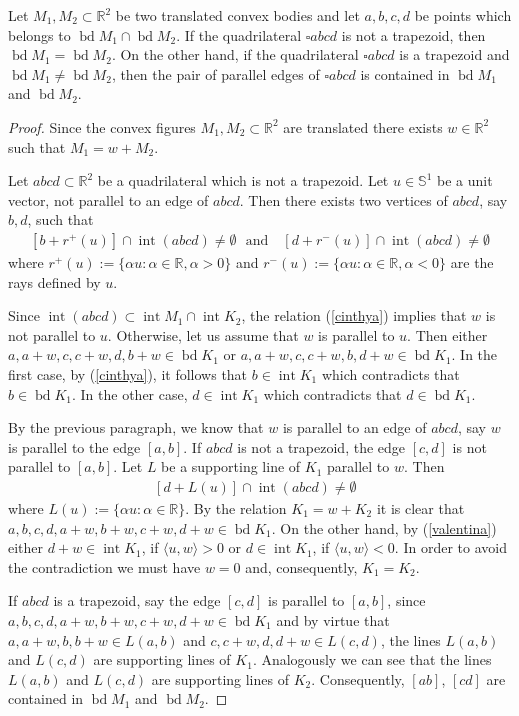 \documentclass[10pt,a4paper]{amsart}
\newcommand{\Rd}{\mathbb{R}^2}
\newcommand{\bd}{\operatorname*{bd}}
\newcommand{\inte}{\operatorname*{int}}
\begin{document}
\begin{lemma}\label{parcera}
Let $M_1,M_2\subset \Rd$ be two translated convex bodies and let $a,b,c,d$ be points which belongs to $\bd M_1\cap \bd M_2$. If the quadrilateral $\square abcd$ is not a trapezoid, then $\bd M_1=\bd M_2$. On the other hand, if the quadrilateral $\square abcd$ is a trapezoid and $\bd M_1\not= \bd M_2$, then the pair of parallel edges of $\square abcd$ is contained in $\bd M_1$ and $\bd M_2$.
\end{lemma}

\begin{proof}
Since the convex figures $M_1,M_2\subset \Rd$ are translated there exists $w\in \Rd$ such that $M_1=w+M_2$.

Let $abcd \subset \mathbb{R}^2$ be a quadrilateral which is not a trapezoid.
Let $u\in \mathbb{S}^1$ be a unit vector, not parallel to an edge of $abcd$. Then there exists two vertices of $abcd$, say $b,d$,  such that 
\begin{eqnarray}\label{cinthya}
[b+r^+(u)]\cap \inte (abcd)\not= \emptyset \textrm{ }\textrm{and } \textrm{ }[d+r^{-}(u)]\cap \inte (abcd)\not= \emptyset
\end{eqnarray}
where $r^+(u):=\{\alpha u: \alpha \in \mathbb{R}, \alpha>0 \}$ and $r^{-}(u):=\{\alpha u: \alpha \in \mathbb{R}, \alpha<0 \}$ are the rays defined by $u$. 

Since $\inte (abcd) \subset \inte M_1 \cap \inte K_2$, the relation (\ref{cinthya}) implies that $w$ is not parallel to $u$. O\-ther\-wise, let us assume that $w$ is parallel to $u$. Then either $a,a+w,c,c+w,d,b+w\in \bd K_1$ or $a,a+w,c,c+w,b,d+w\in \bd K_1$. In the first case, by (\ref{cinthya}), it follows that $b\in \inte K_1$ which contradicts that $b\in \bd K_1$. In the other case,  $d\in \inte K_1$ which contradicts that $d\in \bd K_1$.

By the previous paragraph, we know that $w$ is parallel to an edge of $abcd$, say $w$ is parallel to the edge $[a,b]$. If $abcd$ is not a trapezoid, the edge $[c,d]$ is not parallel to $[a,b]$. Let $L$ be a supporting line of $K_1$ parallel to $w$. Then 
\begin{eqnarray}\label{valentina}
[d+L(u)]\cap \inte (abcd)\not= \emptyset \textrm{ } 
\end{eqnarray}
where $L(u):=\{\alpha u: \alpha \in \mathbb{R}\}$. By the relation $K_1=w+K_2$ it is clear that  $a,b,c,d,a+w,b+w,c+w,d+w\in \bd K_1$. On the other hand, by (\ref{valentina}) either $d+w\in \inte K_1$, if $\langle u,  w\rangle>0$ or $d\in \inte K_1$, if $\langle u,  w\rangle<0$. In order to avoid the contradiction we must have $w=0$ and, consequently, $K_1=K_2$.

If $abcd$ is a trapezoid, say the edge $[c,d]$ is  parallel to $[a,b]$, since $a,b,c,d,a+w,b+w,c+w,d+w\in \bd K_1$ and by virtue that $a,a+w,b, b+w\in L(a,b)$ and $c,c+w,d,d+w\in L(c,d)$, the lines $L(a,b)$ and $L(c,d)$ are supporting lines of $K_1$. Analogously we can see that 
the lines $L(a,b)$ and $L(c,d)$ are supporting lines of $K_2$.
Consequently, $[ab]$, $[cd]$ are contained in $\bd M_1$ and $\bd M_2$. 
\end{proof}
\end{document}
